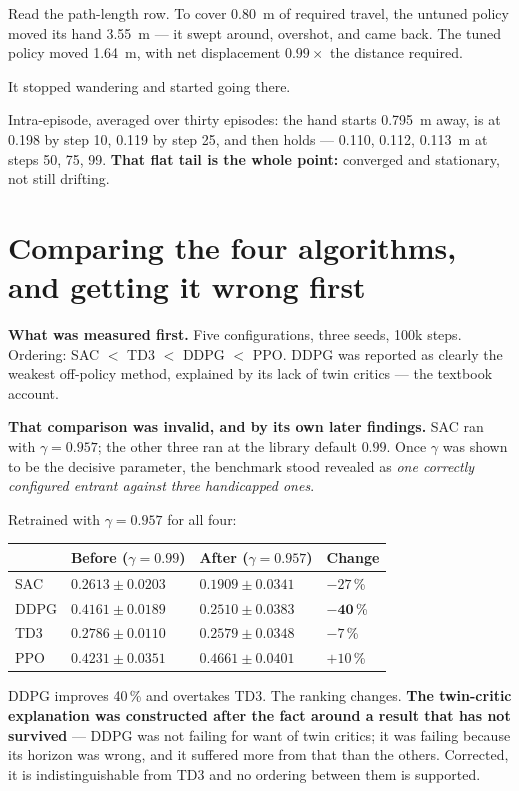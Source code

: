 \begin{plain}
Read the path-length row. To cover \SI{0.80}{\meter} of required travel, the
untuned policy moved its hand \SI{3.55}{\meter} --- it swept around, overshot,
and came back. The tuned policy moved \SI{1.64}{\meter}, with net displacement
$0.99\times$ the distance required.

It stopped wandering and started going there.
\end{plain}

Intra-episode, averaged over thirty episodes: the hand starts \SI{0.795}{\meter}
away, is at \SI{0.198}{} by step 10, \SI{0.119}{} by step 25, and then holds ---
\SI{0.110}{}, \SI{0.112}{}, \SI{0.113}{\meter} at steps 50, 75, 99. \textbf{That
flat tail is the whole point:} converged and stationary, not still drifting.

\section{Comparing the four algorithms, and getting it wrong first}
\label{sec:fairness}

\textbf{What was measured first.} Five configurations, three seeds, 100k steps.
Ordering: SAC $<$ TD3 $<$ DDPG $<$ PPO. DDPG was reported as clearly the weakest
off-policy method, explained by its lack of twin critics --- the textbook account.

\begin{trap}
\textbf{That comparison was invalid, and by its own later findings.} SAC ran with
$\gamma = 0.957$; the other three ran at the library default $0.99$. Once
$\gamma$ was shown to be the decisive parameter, the benchmark stood revealed as
\emph{one correctly configured entrant against three handicapped ones}.

Retrained with $\gamma = 0.957$ for all four:

\begin{center}
\begin{tabular}{@{} L{2.8cm} C{3.0cm} C{3.4cm} C{2.4cm} @{}}
\toprule
& \textbf{Before ($\gamma{=}0.99$)} & \textbf{After ($\gamma{=}0.957$)} & \textbf{Change} \\
\midrule
SAC  & $0.2613 \pm 0.0203$ & $\mathbf{0.1909 \pm 0.0341}$ & $-27$\,\% \\
DDPG & $0.4161 \pm 0.0189$ & $\mathbf{0.2510 \pm 0.0383}$ & $\mathbf{-40}$\,\% \\
TD3  & $0.2786 \pm 0.0110$ & $0.2579 \pm 0.0348$ & $-7$\,\% \\
PPO  & $0.4231 \pm 0.0351$ & $0.4661 \pm 0.0401$ & $+10$\,\% \\
\bottomrule
\end{tabular}
\end{center}

DDPG improves 40\,\% and overtakes TD3. The ranking changes. \textbf{The
twin-critic explanation was constructed after the fact around a result that has
not survived} --- DDPG was not failing for want of twin critics; it was failing
because its horizon was wrong, and it suffered more from that than the others.
Corrected, it is indistinguishable from TD3 and no ordering between them is
supported.
\end{trap}

